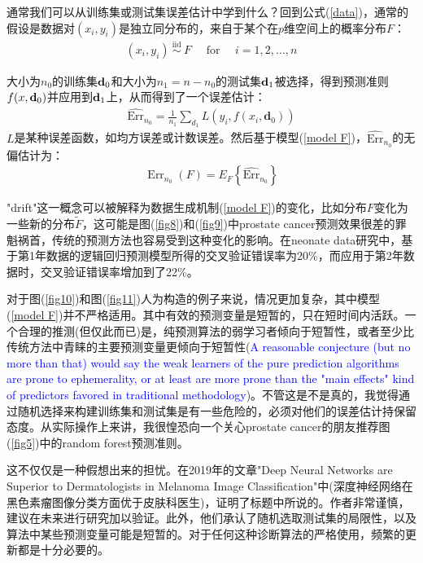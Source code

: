 \documentclass[lang=cn,11pt,a4paper,cite=authoryear]{elegantpaper}
\begin{document}
通常我们可以从训练集或测试集误差估计中学到什么？回到公式(\ref{data})，通常的假设是数据对$(x_i, y_i)$是独立同分布的，来自于某个在$p$维空间上的概率分布$F$：
\begin{align}
\left(x_{i}, y_{i}\right) \stackrel{\text { iid }}{\sim} F \quad \text { for } \quad i=1,2, \ldots, n
\end{align}

大小为$n_0$的训练集$\bold{d}_0$和大小为$n_1 = n-n_0$的测试集$\bold{d}_1$被选择，得到预测准则$f(x, \bold{d}_0)$并应用到$\bold{d}_1$上，从而得到了一个误差估计：
\begin{align}
\label{model F}
\widehat{\text{Err}}_{n_{0}}=\frac{1}{n_{1}} \sum_{d_{1}} L\left(y_{i}, f\left(x_{i}, \mathbf{d}_{0}\right)\right)
\end{align}
$L$是某种误差函数，如均方误差或计数误差。然后基于模型(\ref{model F})，$\widehat{\text{Err}}_{n_{0}}$的无偏估计为：
\begin{align}
\operatorname{Err}_{n_{0}}(F)=E_{F}\left\{\widehat{\text{Err}}_{n_{0}}\right\}
\end{align}

"drift"这一概念可以被解释为数据生成机制(\ref{model F})的变化，比如分布$F$变化为一些新的分布$\tilde{F}$，这可能是图(\ref{fig8})和(\ref{fig9})中prostate cancer预测效果很差的罪魁祸首，传统的预测方法也容易受到这种变化的影响。在neonate data研究中，基于第1年数据的逻辑回归预测模型所得的交叉验证错误率为20\%，而应用于第2年数据时，交叉验证错误率增加到了22\%。

对于图(\ref{fig10})和图(\ref{fig11})人为构造的例子来说，情况更加复杂，其中模型(\ref{model F})并不严格适用。其中有效的预测变量是短暂的，只在短时间内活跃。一个合理的推测(但仅此而已)是，纯预测算法的弱学习者倾向于短暂性，或者至少比传统方法中青睐的主要预测变量更倾向于短暂性(\textcolor{blue}{A reasonable conjecture (but no more than that) would say the weak learners of the pure prediction algorithms are prone to ephemerality, or at least are more prone than the "main effects" kind of predictors favored in traditional methodology})。不管这是不是真的，我觉得通过随机选择来构建训练集和测试集是有一些危险的，必须对他们的误差估计持保留态度。从实际操作上来讲，我很惶恐向一个关心prostate cancer的朋友推荐图(\ref{fig5})中的random forest预测准则。

这不仅仅是一种假想出来的担忧。在2019年的文章"Deep Neural Networks are
Superior to Dermatologists in Melanoma Image Classification"中(深度神经网络在黑色素瘤图像分类方面优于皮肤科医生)，\cite{brinker2019deep}证明了标题中所说的。作者非常谨慎，建议在未来进行研究加以验证。此外，他们承认了随机选取测试集的局限性，以及算法中某些预测变量可能是短暂的。对于任何这种诊断算法的严格使用，频繁的更新都是十分必要的。
\end{document}
